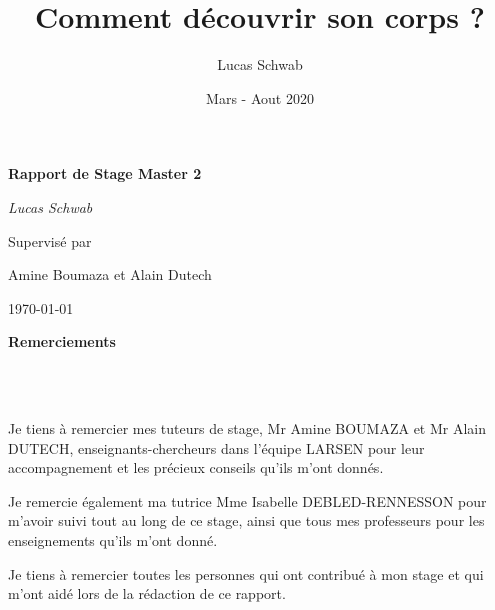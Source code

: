 \documentclass[11pt,french]{report}
\title{Comment découvrir son corps ?}
\author{Lucas Schwab}
\date{Mars - Aout 2020}
\begin{document}

\begin{titlepage}
    \centering
    \vspace*{0.3\textheight}

    {\huge\bfseries Rapport de Stage Master 2\par}
    \vspace{2cm}
    
    {\Large\itshape Lucas Schwab\par}
    \vspace{1,5cm}

    Supervisé par\par
    Amine Boumaza et Alain Dutech

    \vfill

    {\large \today\par}
\end{titlepage}


\noindent\textbf{\Huge Remerciements}

\phantom{INVISIBLE LINE}\\
\phantom{INVISIBLE LINE}\\
\phantom{INVISIBLE LINE}

Je tiens à remercier mes tuteurs de stage, Mr Amine BOUMAZA et Mr Alain DUTECH, enseignants-chercheurs dans l'équipe LARSEN pour leur accompagnement et les précieux conseils qu'ils m'ont donnés.

\phantom{INVISIBLE LINE}

Je remercie également ma tutrice Mme Isabelle DEBLED-RENNESSON pour m'avoir suivi tout au long de ce stage, ainsi que tous mes professeurs pour les enseignements qu'ils m'ont donné.

\phantom{INVISIBLE LINE}

Je tiens à remercier toutes les personnes qui ont contribué à mon stage et qui m'ont aidé lors de la rédaction de ce rapport.

\tableofcontents


\end{document}
